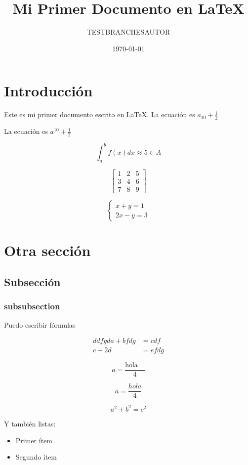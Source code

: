 \documentclass{article} %
\title{Mi Primer Documento en LaTeX}
\author{TESTBRANCHESAUTOR}
\date{\today} %
\begin{document}
\maketitle

\section{Introducción}

Este es mi primer documento escrito en \LaTeX. La ecuación es $a_{10} + \frac{1}{2}$

La ecuación es $a^{10} + \frac{1}{2}$

\[
\int_{a}^{b} f(x) dx \approx 5 \in A
\]

\[
\begin{bmatrix}
1 & 2 & 5 \\
3 & 4 & 6 \\
7 & 8 & 9

\end{bmatrix}
\]

\[
\begin{cases}
x + y = 1 \\
2x - y = 3
\end{cases}
\]


\section{Otra sección}

\subsection{Subsección}

\subsubsection{subsubsection}

Puedo escribir fórmulas

\begin{align*}
  ddfgda + bfdg &= cdf \\
  c + 2d &= efdg
\end{align*}

\[ 
a = \frac{\text{hola} \quad}{4}
\]

\[ 
a = \frac{hola}{4}
\]

\begin{equation}
a^2 + b^2 = c^2
\end{equation}


Y también listas:
\begin{itemize}
  \item Primer ítem
  \item Segundo ítem
\end{itemize}
\end{document}
